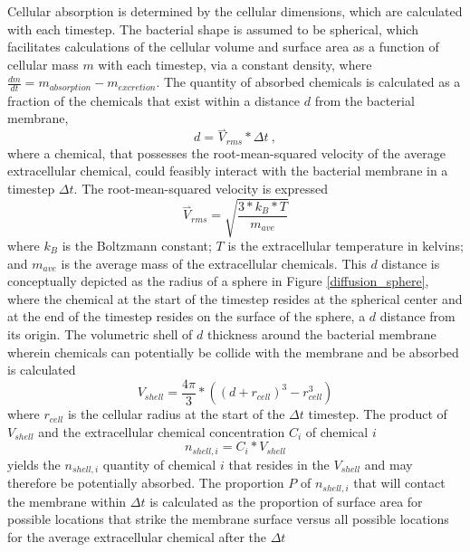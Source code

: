 \begin{supplementary}
Cellular absorption is determined by the cellular dimensions, which are calculated with each timestep. The bacterial shape is assumed to be spherical, which facilitates calculations of the cellular volume and surface area as a function of cellular mass $m$ with each timestep, via a constant density, where $\frac{dm}{dt}=m_{absorption}-m_{excretion}$. The quantity of absorbed chemicals is calculated as a fraction of the chemicals that exist within a distance $d$ from the bacterial membrane,
\begin{equation}
    d=\overset{\rightharpoonup}{V}_{rms}*\Delta t~,
\end{equation} 
where a chemical, that possesses the root-mean-squared velocity of the average extracellular chemical, could feasibly interact with the bacterial membrane in a timestep $\Delta t$. The root-mean-squared velocity is expressed
\begin{equation}
    \overset{\rightharpoonup}{V}_{rms}=\sqrt{\frac{3*k_B*T}{m_{ave}}}
\end{equation} 		
where $k_B$ is the Boltzmann constant; $T$ is the extracellular temperature in kelvins; and $m_{ave}$ is the average mass of the extracellular chemicals. This $d$ distance is conceptually depicted as the radius of a sphere in Figure \ref{diffusion_sphere}, where the chemical at the start of the timestep resides at the spherical center and at the end of the timestep resides on the surface of the sphere, a $d$ distance from its origin. The volumetric shell of $d$ thickness around the bacterial membrane wherein chemicals can potentially be collide with the membrane and be absorbed is calculated
\begin{equation} \label{shell_volume}
    V_{shell}=\frac{4\pi}{3}*((d+r_{cell})^3-r_{cell}^3)
\end{equation}
where $r_{cell}$ is the cellular radius at the start of the $\Delta t$ timestep. The product of $V_{shell}$ and the extracellular chemical concentration $C_i$ of chemical $i$ 
\begin{equation} \label{shell_quantity}
    n_{shell,i}=C_i*V_{shell}
\end{equation}
yields the $n_{shell,i}$ quantity of chemical $i$ that resides in the $V_{shell}$ and may therefore be potentially absorbed. The proportion $P$ of $n_{shell,i}$ that will contact the membrane within $\Delta t$ is calculated as the proportion of surface area for possible locations that strike the membrane surface versus all possible locations for the average extracellular chemical after the $\Delta t$ 

\end{supplementary}
